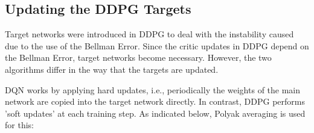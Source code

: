 \subsection{Updating the DDPG Targets}

Target networks were introduced in DDPG to deal with the instability caused due to the use of the 
Bellman Error. Since the critic updates in DDPG depend on the Bellman Error, target networks 
become necessary. However, the two algorithms differ in the way that the targets are updated.

DQN works by applying hard updates, i.e., periodically the weights of the main network are copied 
into the target network directly. In contrast, DDPG performs 'soft updates' at each training step. 
As indicated below, Polyak averaging is used for this:

